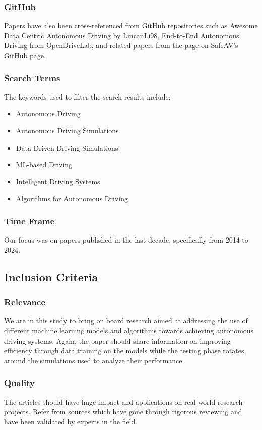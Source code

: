 \documentclass[lettersize,journal]{IEEEtran}
\begin{document}
\subsubsection{GitHub}
Papers have also been cross-referenced from GitHub repositories such as Awesome Data Centric Autonomous Driving by LincanLi98, End-to-End Autonomous Driving from OpenDriveLab, and related papers from the page on SafeAV's GitHub page.

\subsubsection{Search Terms}
The keywords used to filter the search results include:
\begin{itemize}
    \item Autonomous Driving
    \item Autonomous Driving Simulations
    \item Data-Driven Driving Simulations
    \item ML-based Driving
    \item Intelligent Driving Systems
    \item Algorithms for Autonomous Driving
\end{itemize}

\subsubsection{Time Frame}
Our focus was on papers published in the last decade, specifically from 2014 to 2024.

\subsection{Inclusion Criteria}
\subsubsection{Relevance}
We are in this study to bring on board research aimed at addressing the use of different machine learning models and algorithms towards achieving autonomous driving systems. Again, the paper should share information on improving efficiency through data training on the models while the testing phase rotates around the simulations used to analyze their performance.

\subsubsection{Quality}
 The articles should have huge impact and applications on real world research-projects. Refer from sources which have gone through rigorous reviewing and have been validated by experts in the field.
\end{document}

